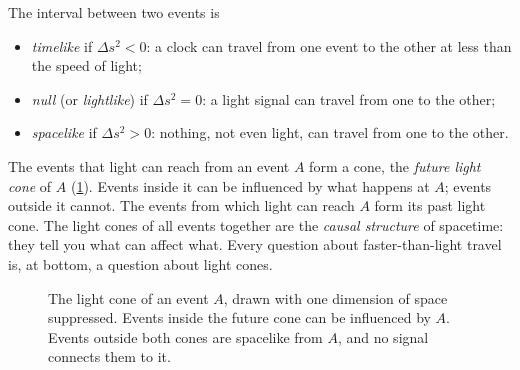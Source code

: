 \begin{definition}
The interval between two events is
\begin{itemize}
\item \emph{timelike} if $\Delta s^{2} < 0$: a clock can travel from one event
  to the other at less than the speed of light;
\item \emph{null} (or \emph{lightlike}) if $\Delta s^{2} = 0$: a light signal
  can travel from one to the other;
\item \emph{spacelike} if $\Delta s^{2} > 0$: nothing, not even light, can
  travel from one to the other.
\end{itemize}
\end{definition}

The events that light can reach from an event $A$ form a cone, the
\emph{future light cone} of $A$ (\cref{fig:light-cone}). Events inside it can
be influenced by what happens at $A$; events outside it cannot. The events
from which light can reach $A$ form its past light cone. The light cones of all
events together are the \emph{causal structure} of spacetime: they tell you
what can affect what. Every question about faster-than-light travel is, at
bottom, a question about light cones.

\begin{figure}[htbp]
\centering
{}
\caption{The light cone of an event $A$, drawn with one dimension of space
suppressed. Events inside the future cone can be influenced by $A$. Events
outside both cones are spacelike from $A$, and no signal connects them to it.}
\label{fig:light-cone}
\end{figure}

